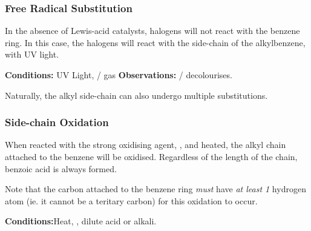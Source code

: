 

			\subsubsection{Free Radical Substitution}

				In the absence of Lewis-acid catalysts, halogens will not react with the benzene ring. In this case, the halogens will
				react with the side-chain of the alkylbenzene, with UV light.

				\vspace{1.5em}

				\vbox{\textbf{Conditions:} \tabto{35mm}UV Light,  /  gas}
				\vbox{\textbf{Observations:} \tabto{35mm}  /   decolourises.}


				Naturally, the alkyl side-chain can also undergo multiple substitutions.




			\pagebreak
			\subsubsection{Side-chain Oxidation}

				When reacted with the strong oxidising agent, , and heated, the alkyl chain attached to the benzene will be oxidised.
				Regardless of the length of the chain, benzoic acid is always formed.

				Note that the carbon attached to the benzene ring \textit{must} have \textit{at least 1} hydrogen atom (ie. it cannot be a
				teritary carbon) for this oxidation to occur.

				\vspace{1.5em}

				\vbox{\textbf{Conditions:}\tabto{35mm}Heat, , dilute acid or alkali.}

